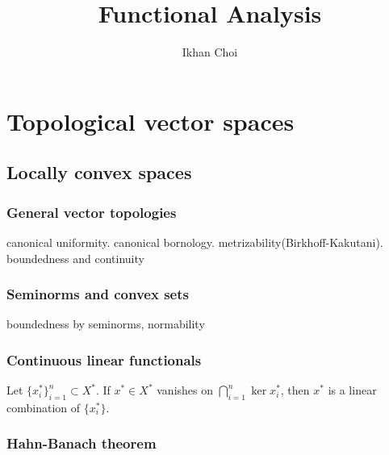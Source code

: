 \documentclass{../note}
\begin{document}
\title{Functional Analysis}
\author{Ikhan Choi}
\maketitle
\tableofcontents

\part{Topological vector spaces}


\chapter{Locally convex spaces}
\section{General vector topologies}
canonical uniformity.
canonical bornology.
metrizability(Birkhoff-Kakutani).
boundedness and continuity

\section{Seminorms and convex sets}
boundedness by seminorms, normability

\section{Continuous linear functionals}
\begin{prb}
Let $\{x_i^*\}_{i=1}^n\subset X^*$.
If $x^*\in X^*$ vanishes on $\bigcap_{i=1}^n\ker x_i^*$, then $x^*$ is a linear combination of $\{x_i^*\}$.
\end{prb}

\begin{prb}
\end{prb}

\begin{prb}
\end{prb}


\section{Hahn-Banach theorem}

\begin{prb}
\end{prb}
\end{document}
